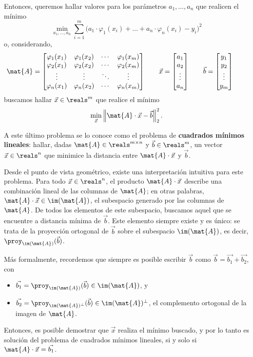 Entonces, queremos hallar valores para los parámetros $a_1, \dots, a_n$ que
realicen el mínimo
\[ \min_{a_1,\dots,a_n} \sum_{i=1}^{m} \big( a_1 \cdot \varphi_1(x_i)
    + \dots + a_n \cdot \varphi_n(x_i) - y_i \big)^2 \]
o, considerando,
\[ \mat{A} = \begin{bmatrix}
    \varphi_1(x_1) & \varphi_1(x_2) & \cdots & \varphi_1(x_m) \\
    \varphi_2(x_1) & \varphi_2(x_2) & \cdots & \varphi_2(x_m) \\
    \vdots         & \vdots         & \ddots & \vdots \\
    \varphi_n(x_1) & \varphi_n(x_2) & \cdots & \varphi_n(x_m) 
\end{bmatrix} \qquad
\vec{x} = \begin{bmatrix}
    a_1 \\ a_2 \\ \vdots \\ a_n
\end{bmatrix} \qquad
\vec{b} = \begin{bmatrix}
    y_1 \\ y_2 \\ \vdots \\ y_m
\end{bmatrix} \qquad \]
buscamos hallar $\vec{x} \in \reals^m$ que realice el mínimo
\[ \min_{\vec{x}} \left\Vert \mat{A} \cdot \vec{x} - \vec{b} \right\Vert_2^2. \]

A este último problema se lo conoce como el problema de \textbf{cuadrados
mínimos lineales}: hallar, dadas $\mat{A} \in \reals^{m \times n}$ y $\vec{b}
\in \reals^m$, un vector $\vec{x} \in \reals^n$ que minimice la distancia
entre $\mat{A} \cdot \vec{x}$ y $\vec{b}$.

Desde el punto de vista geométrico, existe una interpretación intuitiva para
este problema. Para todo $\vec{x} \in \reals^n$, el producto $\mat{A}
\cdot \vec{x}$ describe una combinación lineal de las columnas de $\mat{A}$;
en otras palabras, $\mat{A} \cdot \vec{x} \in \im(\mat{A})$, el subespacio generado por las
columnas de $\mat{A}$. De todos los elementos de este subespacio, buscamos
aquel que se encuentre a distancia mínima de $\vec{b}$. Este elemento siempre
existe y es único: se trata de la proyección ortogonal de $\vec{b}$ sobre el
subespacio $\im(\mat{A})$, es decir, $\proy_{\im(\mat{A})}(\vec{b})$.

Más formalmente, recordemos que siempre es posible escribir $\vec{b}$ como
$\vec{b} = \vec{b_1} + \vec{b_2}$, con
\begin{itemize}
\item $\vec{b_1} = \proy_{\im(\mat{A})}(\vec{b}) \in \im(\mat{A})$, y
\item $\vec{b_2} = \proy_{\im(\mat{A})^{\bot}}(\vec{b}) \in
    \im(\mat{A})^{\bot}$, el complemento ortogonal de la imagen de $\mat{A}$.
\end{itemize}
Entonces, es posible demostrar que $\vec{x}$ realiza el mínimo buscado,
y por lo tanto es solución del problema de cuadrados mínimos lineales,
si y solo si $\mat{A} \cdot \vec{x} = \vec{b_1}$.

